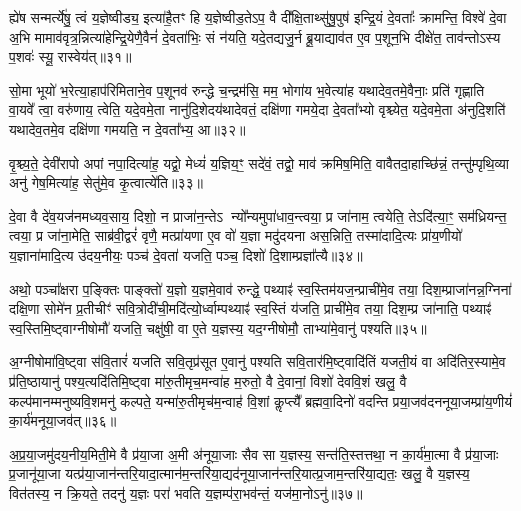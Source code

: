 ह्ये॑ष सन्मर्त्ये॑षु॒ त्वं य॒ज्ञेष्वीड्य॒ इत्या॑है॒तꣳ हि य॒ज्ञेष्वीड॒ते\-ऽप॒ वै दी᳚क्षि॒ताथ्सु॑षु॒पुष॑ इन्द्रि॒यं दे॒वताः᳚ क्रामन्ति॒ विश्वे॑ दे॒वा अ॒भि मामाव॑वृत्र॒न्नित्या॑हेन्द्रि॒येणै॒वैनं॑ दे॒वता॑भिः॒ सं न॑यति॒ यदे॒तद्यजु॒र्न ब्रू॒याद्याव॑त ए॒व प॒शून॒भि दीक्षे॑त॒ ताव॑न्तो\-ऽस्य प॒शवः॑ स्यू॒ रास्वेय॑त्॥३१॥

सो॒मा भूयो॑ भ॒रेत्या॒हाप॑रिमिताने॒व प॒शूनव॑ रुन्द्धे च॒न्द्रम॑सि॒ मम॒ भोगा॑य भ॒वेत्या॑ह यथादेव॒तमे॒वैनाः॒ प्रति॑ गृह्णाति वा॒यवे᳚ त्वा॒ वरु॑णाय॒ त्वेति॒ यदे॒वमे॒ता नानु॑दि॒शेदय॑थादेवतं॒ दक्षि॑णा गमये॒दा दे॒वता᳚भ्यो वृश्च्येत॒ यदे॒वमे॒ता अ॑नुदि॒शति॑ यथादेव॒तमे॒व दक्षि॑णा गमयति॒ न दे॒वता᳚भ्य॒ आ॥३२॥

वृ॒श्च्य॒ते॒ देवी॑रापो अपां नपा॒दित्या॑ह॒ यद्वो॒ मेध्यं॑ य॒ज्ञिय॒ꣳ॒ सदे॑वं॒ तद्वो॒ माव॑ क्रमिष॒मिति॒ वावैतदा॒हाच्छि॑न्नं॒ तन्तु॑म्पृथि॒व्या अनु॑ गेष॒मित्या॑ह॒ सेतु॑मे॒व कृ॒त्वात्ये॑ति॥३३॥

{}

दे॒वा वै दे॑व॒यज॑नमध्यव॒साय॒ दिशो॒ न प्राजा॑न॒न्ते\-ऽ न्यो᳚न्यमुपा॑धाव॒न्त्वया॒ प्र जा॑नाम॒ त्वयेति॒ ते\-ऽदि॑त्या॒ꣳ॒ सम॑ध्रियन्त॒ त्वया॒ प्र जा॑ना॒मेति॒ साब्र॑वी॒द्वरं॑ वृणै॒ मत्प्रा॑यणा ए॒व वो॑ य॒ज्ञा मदु॑दयना अस॒न्निति॒ तस्मा॑दादि॒त्यः प्रा॑य॒णीयो॑ य॒ज्ञाना॑मादि॒त्य उ॑दय॒नीयः॒ पञ्च॑ दे॒वता॑ यजति॒ पञ्च॒ दिशो॑ दि॒शाम्प्रज्ञा᳚त्यै॥३४॥

अथो॒ पञ्चा᳚क्षरा प॒ङ्क्तिः पाङ्क्तो॑ य॒ज्ञो य॒ज्ञमे॒वाव॑ रुन्द्धे॒ पथ्याꣴ॑ स्व॒स्तिम॑यज॒न्प्राची॑मे॒व तया॒ दिश॒म्प्राजा॑नन्न॒ग्निना॑ दक्षि॒णा सोमे॑न प्र॒तीचीꣳ॑ सवि॒त्रोदी॑ची॒मदि॑त्यो॒र्ध्वाम्पथ्याꣴ॑ स्व॒स्तिं य॑जति॒ प्राची॑मे॒व तया॒ दिश॒म्प्र जा॑नाति॒ पथ्याꣴ॑ स्व॒स्तिमि॒ष्ट्वाग्नीषोमौ॑ यजति॒ चक्षु॑षी॒ वा ए॒ते य॒ज्ञस्य॒ यद॒ग्नीषोमौ॒ ताभ्या॑मे॒वानु॑ पश्यति॥३५॥

अ॒ग्नीषोमा॑वि॒ष्ट्वा स॑वि॒तारं॑ यजति सवि॒तृप्र॑सूत ए॒वानु॑ पश्यति सवि॒तार॑मि॒ष्ट्वादि॑तिं यजती॒यं वा अदि॑तिर॒स्यामे॒व प्र॑ति॒ष्ठायानु॑ पश्य॒त्यदि॑तिमि॒ष्ट्वा मा॑रु॒तीमृच॒मन्वा॑ह म॒रुतो॒ वै दे॒वानां॒ विशो॑ देववि॒शं खलु॒ वै कल्प॑मानम्मनुष्यवि॒श\-मनु॑ कल्पते॒ यन्मा॑रु॒तीमृच॑म॒न्वाह॑ वि॒शां कॢप्त्यै᳚ ब्रह्मवा॒दिनो॑ वदन्ति प्रया॒जव॑दननूया॒जम्प्रा॑य॒णीयं॑ का॒र्य॑मनूया॒जव॑त्॥३६॥

अ॒प्र॒या॒जमु॑दय॒नीय॒मिती॒मे वै प्र॑या॒जा अ॒मी अ॑नूया॒जाः सैव सा य॒ज्ञस्य॒ सन्त॑ति॒स्तत्तथा॒ न का॒र्य॑मा॒त्मा वै प्र॑या॒जाः प्र॒जानू॑या॒जा यत्प्र॑या॒जान॑न्तरि॒यादा॒त्मान॑म॒न्तरि॑या॒द्यद॑नूया॒जान॑न्तरि॒यात्प्र॒जाम॒न्तरि॑या॒द्यतः॒ खलु॒ वै य॒ज्ञस्य॒ वित॑तस्य॒ न क्रि॒यते॒ तदनु॑ य॒ज्ञः परा॑ भवति य॒ज्ञम्प॑रा॒भव॑न्तं॒ यज॑मा॒नो\-ऽनु॑॥३७॥

